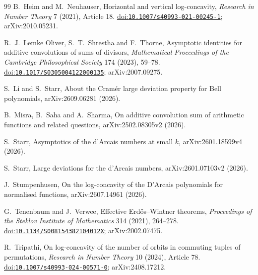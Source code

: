 \documentclass[11pt,a4paper]{article}
\theoremstyle{remark}
\numberwithin{equation}{section}
\newcommand{\doi}[1]{\href{https://doi.org/#1}{doi:\nolinkurl{#1}}}
\begin{document}
\begin{thebibliography}{99}
 B.~Heim and M.~Neuhauser, Horizontal and vertical log-concavity, \emph{Research in Number Theory} 7 (2021), Article 18. \doi{10.1007/s40993-021-00245-1}; arXiv:2010.05231.

 R.~J.~Lemke Oliver, S.~T.~Shrestha and F.~Thorne, Asymptotic identities for additive convolutions of sums of divisors, \emph{Mathematical Proceedings of the Cambridge Philosophical Society} 174 (2023), 59--78. \doi{10.1017/S0305004122000135}; arXiv:2007.09275.

 S.~Li and S.~Starr, About the Cram\'er large deviation property for Bell polynomials, arXiv:2609.06281 (2026).

 B.~Misra, B.~Saha and A.~Sharma, On additive convolution sum of arithmetic functions and related questions, arXiv:2502.08305v2 (2026).

 S.~Starr, Asymptotics of the d'Arcais numbers at small $k$, arXiv:2601.18599v4 (2026).

 S.~Starr, Large deviations for the d'Arcais numbers, arXiv:2601.07103v2 (2026).

 J.~Stumpenhusen, On the log-concavity of the D'Arcais polynomials for normalised functions, arXiv:2607.14961 (2026).

 G.~Tenenbaum and J.~Verwee, Effective Erd\H{o}s--Wintner theorems, \emph{Proceedings of the Steklov Institute of Mathematics} 314 (2021), 264--278. \doi{10.1134/S008154382104012X}; arXiv:2002.07475.

 R.~Tripathi, On log-concavity of the number of orbits in commuting tuples of permutations, \emph{Research in Number Theory} 10 (2024), Article 78. \doi{10.1007/s40993-024-00571-0}; arXiv:2408.17212.

\end{thebibliography}
\end{document}
